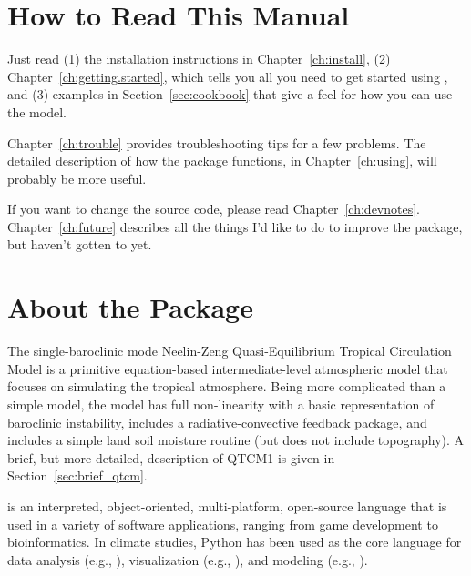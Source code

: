 

%
\section{How to Read This Manual}

Just read 
(1) the installation instructions in Chapter~\ref{ch:install},
(2) Chapter~\ref{ch:getting.started},
which tells you all you need to get started using , and
(3) examples in Section~\ref{sec:cookbook} that give a feel
for how you can use the model.

Chapter~\ref{ch:trouble} provides troubleshooting tips for
a few problems.
The detailed description of how the package functions, 
in Chapter~\ref{ch:using}, will probably be more useful.

If you want to change the source code, please read
Chapter~\ref{ch:devnotes}.  Chapter~\ref{ch:future} describes
all the things I'd like to do to improve the package, but haven't
gotten to yet.




\section{About the Package}

The single-baroclinic mode
Neelin-Zeng Quasi-Equilibrium Tropical Circulation Model
%
	{}
is a primitive equation-based intermediate-level atmospheric model
that focuses on simulating the tropical atmosphere.  Being more
complicated than a simple model, the model has full non-linearity
with a basic representation of baroclinic instability,
includes a radiative-convective feedback package, and includes a
simple land soil moisture routine (but does not include topography).
A brief, but more detailed, description of QTCM1 is given in
Section~\ref{sec:brief_qtcm}.

is an interpreted, object-oriented, multi-platform,
open-source language that is used in a variety of software applications,
ranging from game development to bioinformatics.
In climate studies, Python has been used as the core language for
data analysis
(e.g., ),
visualization
(e.g., ),
and 
modeling
(e.g., ).


